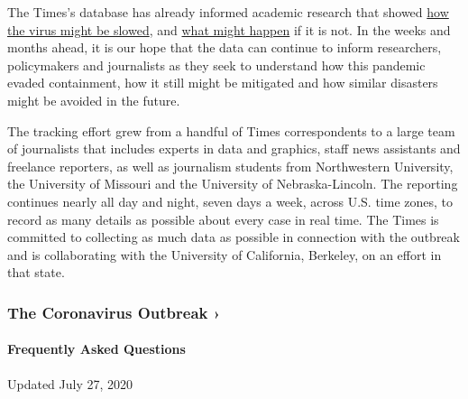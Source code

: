 The Times's database has already informed academic research that showed
\href{https://www.nytimes.com/interactive/2020/03/20/us/coronavirus-model-us-outbreak.html}{how
the virus might be slowed}, and
\href{https://www.gainesville.com/opinion/20200325/stephen-j-hagen-and-peter-j-hirschfeld-florida-must-be-locked-down-now}{what
might happen} if it is not. In the weeks and months ahead, it is our
hope that the data can continue to inform researchers, policymakers and
journalists as they seek to understand how this pandemic evaded
containment, how it still might be mitigated and how similar disasters
might be avoided in the future.

The tracking effort grew from a handful of Times correspondents to a
large team of journalists that includes experts in data and graphics,
staff news assistants and freelance reporters, as well as journalism
students from Northwestern University, the University of Missouri and
the University of Nebraska-Lincoln. The reporting continues nearly all
day and night, seven days a week, across U.S. time zones, to record as
many details as possible about every case in real time. The Times is
committed to collecting as much data as possible in connection with the
outbreak and is collaborating with the University of California,
Berkeley, on an effort in that state.

\href{https://www.nytimes.com/news-event/coronavirus?action=click\&pgtype=Article\&state=default\&region=MAIN_CONTENT_3\&context=storylines_faq}{}

\hypertarget{the-coronavirus-outbreak-}{%
\subsubsection{The Coronavirus Outbreak
›}\label{the-coronavirus-outbreak-}}

\hypertarget{frequently-asked-questions}{%
\paragraph{Frequently Asked
Questions}\label{frequently-asked-questions}}

Updated July 27, 2020

